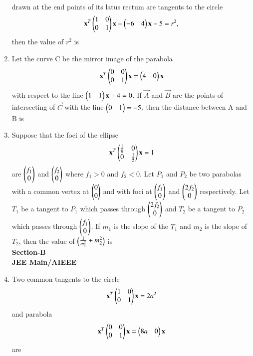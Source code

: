 \begin{enumerate}[label=\arabic*.,ref=\thesubsection.\theenumi]
\begin{align}
    \end{align} drawn at the end points of its latus rectum are tangents to the circle
    \begin{align}
    \mathbf{x}^T\begin{pmatrix}1&0\\0&1\end{pmatrix}\mathbf{x}+\begin{pmatrix}-6&4\end{pmatrix}\mathbf{x}-5=r^2,
    \end{align} then the value of $r^2$ is 
    \item Let the curve C be the mirror image of the parabola
    \begin{align}
    \mathbf{x}^T\begin{pmatrix}0&0\\0&1\end{pmatrix}\mathbf{x}=\begin{pmatrix}4&0\end{pmatrix}\mathbf{x}
    \end{align} with respect to the line $\begin{pmatrix}1&1\end{pmatrix}\mathbf{x}+4=0$. If $\vec{A}$ and $\vec{B}$ are the points of intersecting of $\vec{C}$ with the line $\begin{pmatrix}0&1\end{pmatrix}=-5$, then the distance between  
    A and B is
    \item Suppose that the foci of the ellipse 
    \begin{align}
    \mathbf{x}^T\begin{pmatrix}\frac{1}{9}&0\\0&\frac{1}{5}\end{pmatrix}\mathbf{x}=1
    \end{align} are $\begin{pmatrix}f_1\\0\end{pmatrix}$ and $\begin{pmatrix}f_2\\0\end{pmatrix}$ where $f_1>0$ and $f_2<0$. Let $P_1$ and 			$P_2$ be two parabolas with a common vertex at $\begin{pmatrix}0\\0\end{pmatrix}$ and with foci at $\begin{pmatrix}f_1\\0\end{pmatrix}$ 		and $\begin{pmatrix}2f_2\\0\end{pmatrix}$ respectively. Let $T_1$ be a tangent to $P_1$ which passes through
    $\begin{pmatrix}2f_2\\0\end{pmatrix}$ and $T_2$ be a tangent to $P_2$ which passes through $\begin{pmatrix}f_1\\0\end{pmatrix}$. If
    $m_1$ is the slope of the $T_1$ and $m_2$ is the slope of $T_2$, then the value of 
    $\begin{pmatrix}\frac{1}{m_1^2}+m_2^2\end{pmatrix}$ is\\
    {\textbf{Section-B}}\\
    {\textbf{JEE Main/AIEEE}}
    \item Two common tangents to the circle
    \begin{align}
    \mathbf{x}^T\begin{pmatrix}1&0\\0&1\end{pmatrix}\mathbf{x}=2a^2
    \end{align} and parabola
    \begin{align}
    \mathbf{x}^T\begin{pmatrix}0&0\\0&1\end{pmatrix}\mathbf{x}=\begin{pmatrix}8a&0\end{pmatrix}\mathbf{x}
    \end{align} are

\end{enumerate}
